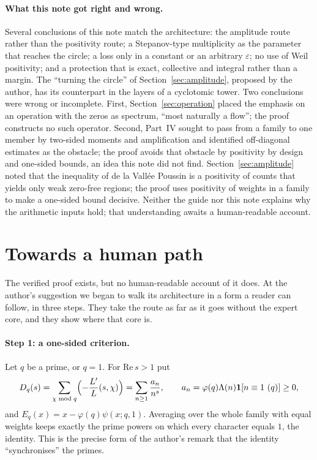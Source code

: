 \documentclass[11pt,a4paper]{article}
\theoremstyle{definition}\newtheorem{definition}[proposition]{Definition}
\theoremstyle{remark}\newtheorem{remark}[proposition]{Remark}
\begin{document}
\paragraph{What this note got right and wrong.} Several conclusions of this note match the architecture: the amplitude route rather than the positivity route; a Stepanov-type multiplicity as the parameter that reaches the circle; a loss only in a constant or an arbitrary $\varepsilon$; no use of Weil positivity; and a protection that is exact, collective and integral rather than a margin. The ``turning the circle'' of Section~\ref{sec:amplitude}, proposed by the author, has its counterpart in the layers of a cyclotomic tower. Two conclusions were wrong or incomplete. First, Section~\ref{sec:operation} placed the emphasis on an operation with the zeros as spectrum, ``most naturally a flow''; the proof constructs no such operator. Second, Part~IV sought to pass from a family to one member by two-sided moments and amplification and identified off-diagonal estimates as the obstacle; the proof avoids that obstacle by positivity by design and one-sided bounds, an idea this note did not find. Section~\ref{sec:amplitude} noted that the inequality of de la Vall\'ee Poussin is a positivity of counts that yields only weak zero-free regions; the proof uses positivity of weights in a family to make a one-sided bound decisive. Neither the guide nor this note explains why the arithmetic inputs hold; that understanding awaits a human-readable account.

\section{Towards a human path}\label{sec:human}
The verified proof exists, but no human-readable account of it does. At the author's suggestion we began to walk its architecture in a form a reader can follow, in three steps. They take the route as far as it goes without the expert core, and they show where that core is.

\paragraph{Step 1: a one-sided criterion.} Let $q$ be a prime, or $q=1$. For $\mathrm{Re}\,s>1$ put
\[
D_q(s)=\sum_{\chi\bmod q}\Bigl(-\frac{L'}{L}(s,\chi)\Bigr)=\sum_{n\ge1}\frac{a_n}{n^s},\qquad a_n=\varphi(q)\Lambda(n)\mathbf 1[n\equiv1\ (q)]\ge0,
\]
and $E_q(x)=x-\varphi(q)\psi(x;q,1)$. Averaging over the whole family with equal weights keeps exactly the prime powers on which every character equals $1$, the identity. This is the precise form of the author's remark that the identity ``synchronises'' the primes.
\end{document}
